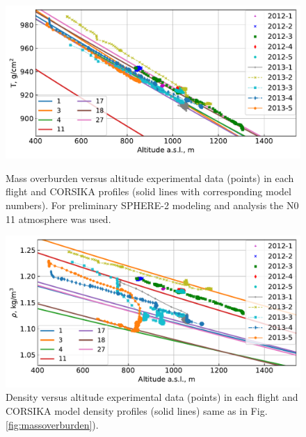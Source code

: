 \documentclass[final,5p,times,twocolumn]{elsarticle}
\begin{document}
\begin{figure}[bt]
\centering
\begin{minipage}[t]{0.48\textwidth}
    \includegraphics[width=\textwidth]{figs/atmosphere_T.pdf}
    \vspace{-1.0pc}
    \caption{Mass overburden versus altitude experimental data (points) in each flight and CORSIKA profiles (solid lines with corresponding model numbers). For preliminary SPHERE-2 modeling and analysis the N0 11 atmosphere was used.}
\label{fig:massoverburden}
\end{minipage}
\vfill
\vspace{1pc}
\begin{minipage}[t]{0.48\textwidth}
    \includegraphics[width=\textwidth]{figs/atmosphere_rho.pdf}
    \vspace{-1.0pc}
    \caption{Density versus altitude experimental data (points) in each flight and CORSIKA model density profiles (solid lines) same as in Fig. \ref{fig:massoverburden}).}
\label{fig:density}
\end{minipage}
\end{figure}

\end{document}
